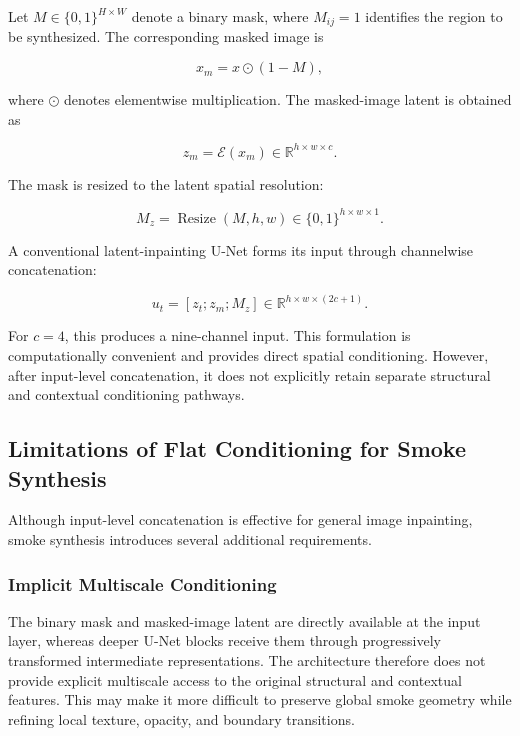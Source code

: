 \documentclass[journal]{IEEEtran}
\begin{document}
Let \(M\in\{0,1\}^{H\times W}\) denote a binary mask, where
\(M_{ij}=1\) identifies the region to be synthesized. The corresponding
masked image is

\begin{equation}
x_m=x\odot(1-M),
\label{eq:masked_image}
\end{equation}

where \(\odot\) denotes elementwise multiplication. The masked-image
latent is obtained as

\begin{equation}
z_m=\mathcal{E}(x_m)
\in\mathbb{R}^{h\times w\times c}.
\label{eq:masked_latent}
\end{equation}

The mask is resized to the latent spatial resolution:

\begin{equation}
M_z
=
\operatorname{Resize}(M,h,w)
\in\{0,1\}^{h\times w\times1}.
\label{eq:latent_mask}
\end{equation}

A conventional latent-inpainting U-Net forms its input through
channelwise concatenation:

\begin{equation}
u_t
=
[z_t;z_m;M_z]
\in
\mathbb{R}^{h\times w\times(2c+1)}.
\label{eq:flat_cond}
\end{equation}

For \(c=4\), this produces a nine-channel input. This formulation is
computationally convenient and provides direct spatial conditioning.
However, after input-level concatenation, it does not explicitly retain
separate structural and contextual conditioning pathways.


\subsection{Limitations of Flat Conditioning for Smoke Synthesis}
\label{subsec:flat_conditioning_limitations}

Although input-level concatenation is effective for general image
inpainting, smoke synthesis introduces several additional requirements.

\subsubsection{Implicit Multiscale Conditioning}

The binary mask and masked-image latent are directly available at the
input layer, whereas deeper U-Net blocks receive them through
progressively transformed intermediate representations. The
architecture therefore does not provide explicit multiscale access to
the original structural and contextual features. This may make it more
difficult to preserve global smoke geometry while refining local
texture, opacity, and boundary transitions.
\end{document}
